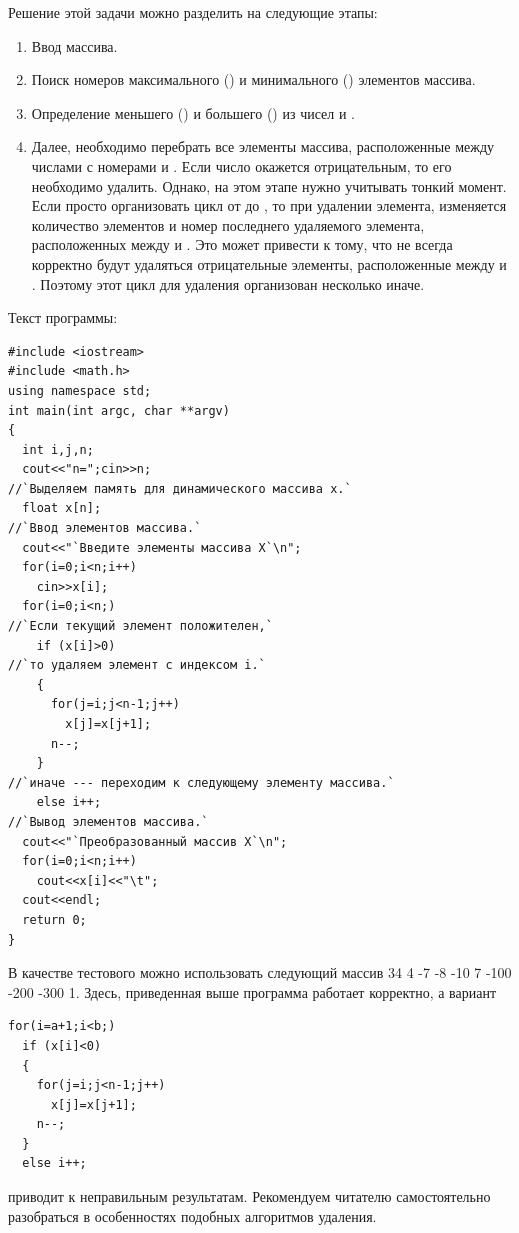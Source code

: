 Решение этой задачи можно разделить на следующие этапы:

\begin{enumerate}
\item Ввод массива.
\item Поиск номеров максимального () и минимального () элементов массива.
\item Определение меньшего () и большего () из чисел  и
.
\item Далее, необходимо перебрать все элементы массива, расположенные между числами с номерами  и
. Если число окажется отрицательным, то его необходимо удалить. Однако, на этом этапе нужно
учитывать тонкий момент. Если просто организовать цикл от  до , то при
удалении элемента, изменяется количество элементов и номер последнего удаляемого элемента, расположенных между
 и . Это может привести к тому, что не всегда корректно будут удаляться
отрицательные элементы, расположенные между  и . Поэтому этот цикл для удаления
организован несколько иначе.
\end{enumerate}

Текст программы:
\begin{lstlisting}
#include <iostream>
#include <math.h>
using namespace std;
int main(int argc, char **argv)
{
  int i,j,n;
  cout<<"n=";cin>>n;
//`Выделяем память для динамического массива x.`
  float x[n];
//`Ввод элементов массива.`
  cout<<"`Введите элементы массива X`\n";
  for(i=0;i<n;i++)
    cin>>x[i];
  for(i=0;i<n;)
//`Если текущий элемент положителен,`
    if (x[i]>0)
//`то удаляем элемент с индексом i.`
    {
      for(j=i;j<n-1;j++)
        x[j]=x[j+1];
      n--;
    }
//`иначе --- переходим к следующему элементу массива.`
    else i++;	
//`Вывод элементов массива.`
  cout<<"`Преобразованный массив X`\n";
  for(i=0;i<n;i++)
    cout<<x[i]<<"\t";
  cout<<endl;
  return 0;
}
\end{lstlisting}


В качестве тестового можно использовать следующий массив 34 4 -7 -8 -10 7 -100 -200 -300 1. Здесь, приведенная
выше программа работает корректно, а вариант 
\begin{lstlisting}
for(i=a+1;i<b;) 
  if (x[i]<0) 
  { 
    for(j=i;j<n-1;j++)
      x[j]=x[j+1]; 
    n--;
  }
  else i++;
\end{lstlisting}
приводит к неправильным результатам. Рекомендуем читателю самостоятельно разобраться в особенностях подобных алгоритмов
удаления.

